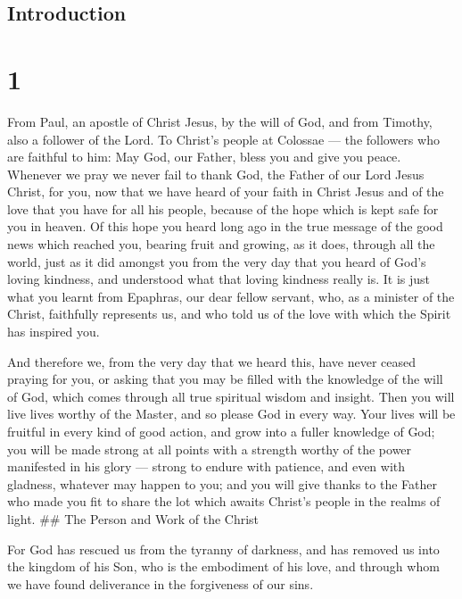 \hypertarget{introduction}{%
\subsection{Introduction}\label{introduction}}

\hypertarget{section}{%
\section{1}\label{section}}

 From Paul, an apostle of Christ Jesus, by the will of God,
and from Timothy, also a follower of the Lord.  To Christ's
people at Colossae --- the followers who are faithful to him: May God,
our Father, bless you and give you peace.  Whenever we pray
we never fail to thank God, the Father of our Lord Jesus Christ, for
you,  now that we have heard of your faith in Christ Jesus
and of the love that you have for all his people,  because
of the hope which is kept safe for you in heaven. Of this hope you heard
long ago in the true message of the good news which reached you,
 bearing fruit and growing, as it does, through all the
world, just as it did amongst you from the very day that you heard of
God's loving kindness, and understood what that loving kindness really
is.  It is just what you learnt from Epaphras, our dear
fellow servant, who, as a minister of the Christ, faithfully represents
us,  and who told us of the love with which the Spirit has
inspired you.

 And therefore we, from the very day that we heard this,
have never ceased praying for you, or asking that you may be filled with
the knowledge of the will of God, which comes through all true spiritual
wisdom and insight.  Then you will live lives worthy of the
Master, and so please God in every way. Your lives will be fruitful in
every kind of good action, and grow into a fuller knowledge of God;
 you will be made strong at all points with a strength
worthy of the power manifested in his glory --- strong to endure with
patience, and even with gladness, whatever may happen to you;
 and you will give thanks to the Father who made you fit to
share the lot which awaits Christ's people in the realms of light. \#\#
The Person and Work of the Christ

 For God has rescued us from the tyranny of darkness, and
has removed us into the kingdom of his Son, who is the embodiment of his
love,  and through whom we have found deliverance in the
forgiveness of our sins.


